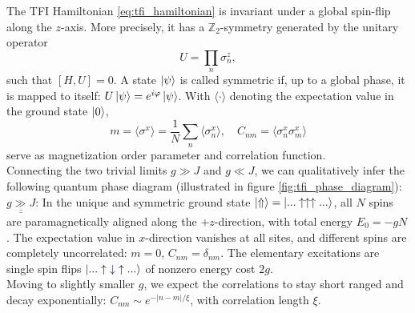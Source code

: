\noindent The TFI Hamiltonian \eqref{eq:tfi_hamiltonian} is invariant under a global spin-flip along the $z$-axis. More precisely, it has a $\mathbb{Z}_2$-symmetry generated by the unitary operator 
\begin{equation}
	U = \prod_n \sigma^z_n,
\end{equation}
such that $[H, U] = 0$. A state $\ket{\psi}$ is called symmetric if, up to a global phase, it is mapped to itself: $U \ket{\psi} = e^{i\varphi} \ket{\psi}$. With $\langle \cdot \rangle$ denoting the expectation value in the ground state $\ket{0}$, 
\begin{equation}
	m = \langle \sigma^x \rangle = \frac{1}{N} \sum_{n} \langle \sigma^x_n \rangle, \hspace{1em}
	C_{nm} = \langle \sigma^x_n \sigma^x_m \rangle
\end{equation}
serve as magnetization order parameter and correlation function. \\[0.5em]

\noindent Connecting the two trivial limits $g \gg J$ and $g \ll J$, we can qualitatively infer the following quantum phase diagram (illustrated in figure \ref{fig:tfi_phase_diagram}): \\

\noindent $\underline{\underline{g \gg J}}$: In the unique and symmetric ground state $\ket{\Uparrow} = \ket{... \uparrow \uparrow \uparrow ...}$, all $N$ spins are paramagnetically aligned along the $+z$-direction, with total energy $E_0 = - gN$. The expectation value in $x$-direction vanishes at all sites, and different spins are completely uncorrelated: $m = 0$, $C_{nm} = \delta_{nm}$. The elementary excitations are single spin flips $\ket{... \uparrow \textcolor{blue}{\downarrow} \uparrow ...}$ of nonzero energy cost $2g$. \\
Moving to slightly smaller $g$, we expect the correlations to stay short ranged and decay exponentially: $C_{nm} \sim e^{-\vert n - m \vert / \xi}$, with correlation length $\xi$. \\

